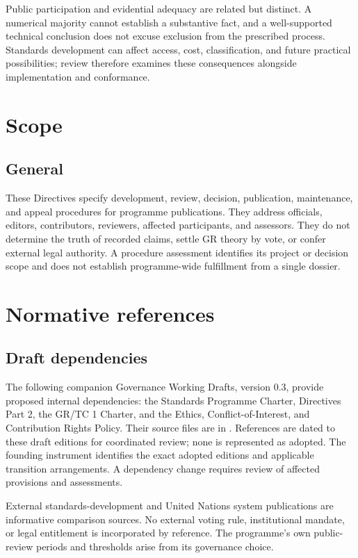 \documentclass[11pt,a4paper]{article}
\begin{document}
Public participation and evidential adequacy are related but distinct. A numerical majority cannot establish a substantive fact, and a well-supported technical conclusion does not excuse exclusion from the prescribed process. Standards development can affect access, cost, classification, and future practical possibilities; review therefore examines these consequences alongside implementation and conformance.

\GSPmainmatter
\section{Scope}
\subsection{General}
These Directives specify development, review, decision, publication, maintenance, and appeal procedures for programme publications. They address officials, editors, contributors, reviewers, affected participants, and assessors. They do not determine the truth of recorded claims, settle GR theory by vote, or confer external legal authority. A procedure assessment identifies its project or decision scope and does not establish programme-wide fulfillment from a single dossier.


\section{Normative references}
\subsection{Draft dependencies}
The following companion Governance Working Drafts, version 0.3, provide proposed internal dependencies: the Standards Programme Charter, Directives Part 2, the GR/TC 1 Charter, and the Ethics, Conflict-of-Interest, and Contribution Rights Policy. Their source files are in . References are dated to these draft editions for coordinated review; none is represented as adopted. The founding instrument identifies the exact adopted editions and applicable transition arrangements. A dependency change requires review of affected provisions and assessments.

External standards-development and United Nations system publications are informative comparison sources. No external voting rule, institutional mandate, or legal entitlement is incorporated by reference. The programme's own public-review periods and thresholds arise from its governance choice.
\end{document}

